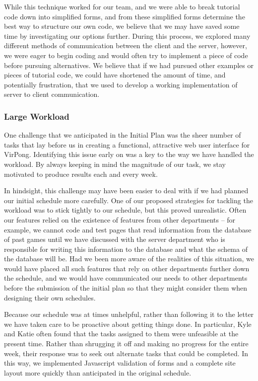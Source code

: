 While this technique worked for our team, and we were able to break tutorial code down into simplified forms, and from these simplified forms determine the best way to structure our own code, we believe that we may have saved some time by investigating our options further. During this process, we explored many different methods of communication between the client and the server, however, we were eager to begin coding and would often try to implement a piece of code before pursuing alternatives. We believe that if we had pursued other examples or pieces of tutorial code, we could have shortened the amount of time, and potentially frustration, that we used to develop a working implementation of server to client communication.


\subsubsection{Large Workload}

One challenge that we anticipated in the Initial Plan was the sheer number of tasks that lay before us in creating a functional, attractive web user interface for VirPong. Identifying this issue early on was a key to the way we have handled the workload. By always keeping in mind the magnitude of our task, we stay motivated to produce results each and every week.

In hindsight, this challenge may have been easier to deal with if we had planned our initial schedule more carefully. One of our proposed strategies for tackling the workload was to stick tightly to our schedule, but this proved unrealistic. Often our features relied on the existence of features from other departments -- for example, we cannot code and test pages that read information from the database of past games until we have discussed with the server department who is responsible for writing this information to the database and what the schema of the database will be. Had we been more aware of the realities of this situation, we would have placed all such features that rely on other departments further down the schedule, and we would have communicated our needs to other departments before the submission of the initial plan so that they might consider them when designing their own schedules.

Because our schedule was at times unhelpful, rather than following it to the letter we have taken care to be proactive about getting things done. In particular, Kyle and Katie often found that the tasks assigned to them were unfeasible at the present time. Rather than shrugging it off and making no progress for the entire week, their response was to seek out alternate tasks that could be completed. In this way, we implemented Javascript validation of forms and a complete site layout more quickly than anticipated in the original schedule.

